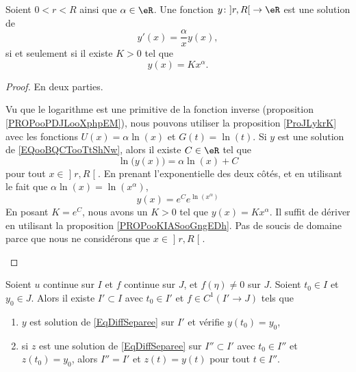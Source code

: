 \begin{proposition}     \label{PROPooIGWTooULXrKI}
	Soient \( 0<r<R\) ainsi que \( \alpha\in \eR\). Une fonction \( y\colon \mathopen] r , R \mathclose[\to \eR\) est une solution de
	\begin{equation}        \label{EQooBQCTooTtShNw}
		y'(x)=\frac{ \alpha }{ x }y(x),
	\end{equation}
	si et seulement si il existe \( K >0\) tel que
	\begin{equation}
		y(x)=Kx^{\alpha}.
	\end{equation}
\end{proposition}

\begin{proof}
	En deux parties.
	\begin{subproof}
		\spitem[\( \Rightarrow\)]
		Vu que le logarithme est une primitive de la fonction inverse (proposition \ref{PROPooPDJLooXphpEM}), nous pouvons utiliser la proposition \ref{ProJLykrK} avec les fonctions \( U(x)=\alpha\ln(x)\) et \( G(t)=\ln(t)\). Si \( y\) est une solution de \eqref{EQooBQCTooTtShNw}, alors il existe \( C\in \eR\) tel que
		\begin{equation}
			\ln\big( y(x) \big)=\alpha\ln(x)+C
		\end{equation}
		pour tout \( x\in\mathopen] r , R \mathclose[\). En prenant l'exponentielle des deux côtés, et en utilisant le fait que \( \alpha\ln(x)=\ln(x^{\alpha})\),
		\begin{equation}
			y(x)= e^{C} e^{\ln(x^{\alpha})}
		\end{equation}
		En posant \( K=e^C\), nous avons un \( K>0\) tel que \( y(x)=Kx^{\alpha}\).
		\spitem[\( \Leftarrow\)]
		Il suffit de dériver en utilisant la proposition \ref{PROPooKIASooGngEDh}. Pas de soucis de domaine parce que nous ne considérons que \( x\in \mathopen] r , R \mathclose[\).
	\end{subproof}
\end{proof}

\begin{proposition} \label{PropOkmXmC}
	Soient \( u\) continue sur \( I\) et \( f\) continue sur \( J\), et \( f(\eta)\neq 0\) sur \( J\). Soient \( t_0\in I\) et \( y_0\in J\). Alors il existe \( I'\subset I\) avec \( t_0\in I'\) et \( f\in C^1(I'\to J)\) tels que
	\begin{enumerate}

		\item
		      \( y\) est solution de \eqref{EqDiffSeparee} sur \( I'\) et vérifie \( y(t_0)=y_0\),
		\item
		      si \( z\) est une solution de \eqref{EqDiffSeparee} sur \( I''\subset I'\) avec \( t_0\in I''\) et \( z(t_0)=y_0\), alors \( I''= I'\) et \( z(t)=y(t)\) pour tout \( t\in I''\).

	\end{enumerate}
\end{proposition}

